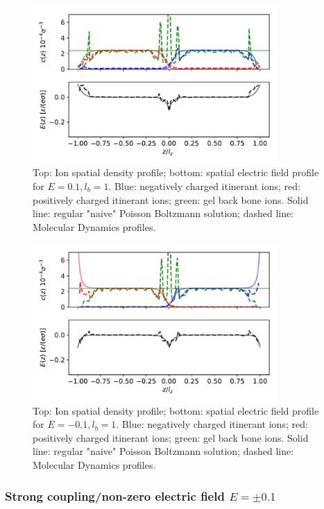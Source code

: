 \documentclass[twoside,twocolumn,9pt]{article}
\begin{document}
\begin{figure}[h]
\centering
  \includegraphics[height=6cm]{fig/Compare_E01_lb1.pdf}
  \caption{Top: Ion spatial density profile; bottom: spatial electric field profile for $E=0.1, l_b=1$. Blue: negatively charged itinerant ions; red: positively charged itinerant ions; green: gel back bone ions. Solid line: regular "naive" Poisson Boltzmann solution; dashed line: Molecular Dynamics profiles.}
  \label{fig:e01_lb1}
\end{figure}

\begin{figure}[h]
\centering
  \includegraphics[height=6cm]{fig/Compare_E-01_lb1.pdf}
  \caption{Top: Ion spatial density profile; bottom: spatial electric field profile for $E=-0.1, l_b=1$. Blue: negatively charged itinerant ions; red: positively charged itinerant ions; green: gel back bone ions. Solid line: regular "naive" Poisson Boltzmann solution; dashed line: Molecular Dynamics profiles.}
  \label{fig:e-01_lb1}
\end{figure}

\subsubsection{Strong coupling/non-zero electric field $E=\pm 0.1$}
\end{document}
